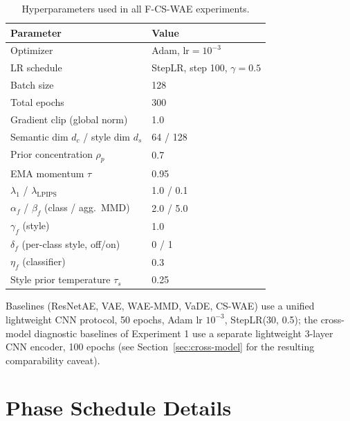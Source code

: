 \documentclass[10pt,letterpaper]{article}
\newcommand{\ours}{F-CS-WAE}
\newcommand{\simple}{CS-WAE}
\begin{document}
\begin{table}[h]
\centering
\small
\caption{Hyperparameters used in all \ours{} experiments.}
\label{tab:hyperparams}
\begin{tabular}{ll}
\toprule
Parameter & Value \\
\midrule
Optimizer & Adam, $\mathrm{lr}=10^{-3}$ \\
LR schedule & StepLR, step 100, $\gamma=0.5$ \\
Batch size & 128 \\
Total epochs & 300 \\
Gradient clip (global norm) & 1.0 \\
Semantic dim $d_c$ / style dim $d_s$ & 64 / 128 \\
Prior concentration $\rho_p$ & 0.7 \\
EMA momentum $\tau$ & 0.95 \\
$\lambda_1$ / $\lambda_{\mathrm{LPIPS}}$ & 1.0 / 0.1 \\
$\alpha_f$ / $\beta_f$ (class / agg.\ MMD) & 2.0 / 5.0 \\
$\gamma_f$ (style) & 1.0 \\
$\delta_f$ (per-class style, off/on) & 0 / 1 \\
$\eta_f$ (classifier) & 0.3 \\
Style prior temperature $\tau_s$ & 0.25 \\
\bottomrule
\end{tabular}
\end{table}

Baselines (ResNetAE, VAE, WAE-MMD, VaDE, \simple{}) use a unified
lightweight CNN protocol, 50 epochs, Adam lr $10^{-3}$, StepLR(30, 0.5); the
cross-model diagnostic baselines of Experiment 1 use a separate lightweight
3-layer CNN encoder, 100 epochs (see Section~\ref{sec:cross-model} for the
resulting comparability caveat).

\section{Phase Schedule Details}
\label{app:schedule}
\end{document}
